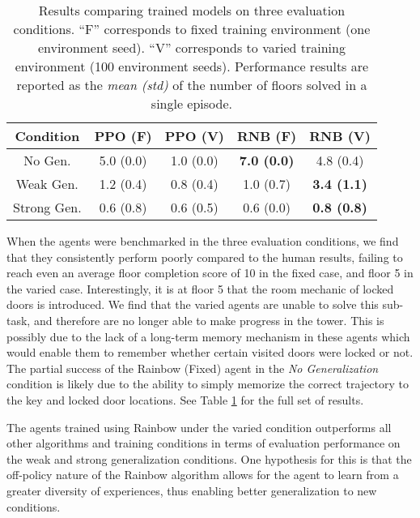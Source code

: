 \documentclass{article}
\begin{document}
\begin{table}
\begin{center}
 \setlength\tabcolsep{4.5pt}
 \begin{tabular}{||c c c c c||} 
 \hline
 Condition & PPO (F) & PPO (V) & RNB (F) & RNB (V) \\
 \hline\hline
 No Gen. & 5.0 (0.0) & 1.0 (0.0) & \textbf{7.0 (0.0)} & 4.8 (0.4) \\ 
 \hline
 Weak Gen. & 1.2 (0.4) & 0.8 (0.4) & 1.0 (0.7) & \textbf{3.4 (1.1)} \\
 \hline
 Strong Gen. & 0.6 (0.8) & 0.6 (0.5) & 0.6 (0.0) & \textbf{0.8 (0.8)} \\
 \hline
\end{tabular}
\end{center}
\caption{Results comparing trained models on three evaluation conditions. ``F'' corresponds to fixed training environment (one environment seed). ``V'' corresponds to varied training environment (100 environment seeds). Performance results are reported as the \emph{mean (std)} of the number of floors solved in a single episode.}
\label{table:agentEvaluation}
\end{table}

When the agents were benchmarked in the three evaluation conditions, we find that they consistently perform poorly compared to the human results, failing to reach even an average floor completion score of 10 in the fixed case, and floor 5 in the varied case. Interestingly, it is at floor 5 that the room mechanic of locked doors is introduced. We find that the varied agents are unable to solve this sub-task, and therefore are no longer able to make progress in the tower. This is possibly due to the lack of a long-term memory mechanism in these agents which would enable them to remember whether certain visited doors were locked or not. The partial success of the Rainbow (Fixed) agent in the \emph{No Generalization} condition is likely due to the ability to simply memorize the correct trajectory to the key and locked door locations. See Table \ref{table:agentEvaluation} for the full set of results.

The agents trained using Rainbow under the varied condition outperforms all other algorithms and training conditions in terms of evaluation performance on the weak and strong generalization conditions. One hypothesis for this is that the off-policy nature of the Rainbow algorithm allows for the agent to learn from a greater diversity of experiences, thus enabling better generalization to new conditions. 
\end{document}
